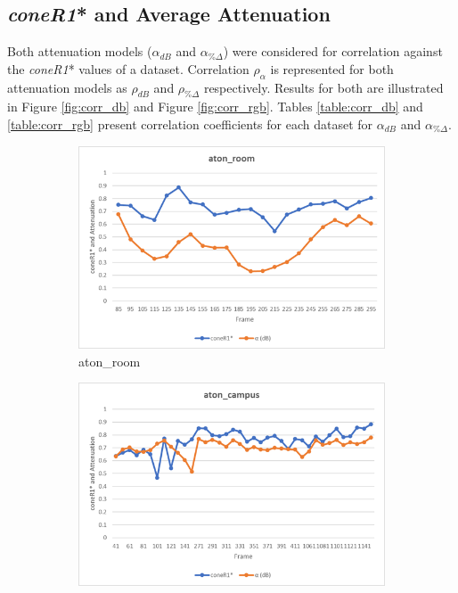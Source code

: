 \subsection{\textit{coneR1}* and Average Attenuation} \label{section:coner1andatten}

Both attenuation models ($\alpha_{dB}$ and $\alpha_{\%\Delta}$) were considered for correlation against the \textit{coneR1}* values of a dataset. Correlation $\rho_{\alpha}$ is represented for both attenuation models as $\rho_{dB}$ and $\rho_{\%\Delta}$ respectively. Results for both are illustrated in Figure \ref{fig:corr_db} and Figure \ref{fig:corr_rgb}. Tables \ref{table:corr_db} and \ref{table:corr_rgb} present correlation coefficients for each dataset for $\alpha_{dB}$ and $\alpha_{\%\Delta}$.

\begin{figure}
  \centering
  \begin{subfigure}{1\linewidth}
  \includegraphics[width=1\linewidth]{figures/room_db_corr.jpg}
  \caption{aton\_room}
\end{subfigure}
\hfill
\begin{subfigure}{.49\linewidth}
  \includegraphics[width=1\linewidth]{figures/campus_db_corr.jpg}

\end{subfigure}
\end{figure}
